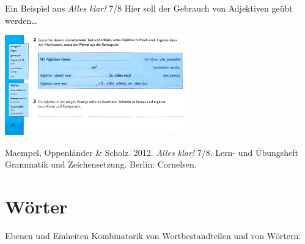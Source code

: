 \begin{frame}
  {Ein Beispiel aus \textit{Alles klar!} 7\slash 8}
  Hier soll der Gebrauch von \alert{Adjektiven} geübt werden\ldots
  \begin{center}
    \includegraphics[width=0.6\textwidth]{graphics/adjektive2}
  \end{center}
  \tiny Maempel, Oppenländer \& Scholz. 2012. \textit{Alles klar!} 7\slash 8. Lern- und Übungsheft Grammatik und Zeichensetzung. Berlin: Cornelsen.
\end{frame}





\section{Wörter}

\begin{frame}
  {Ebenen und Einheiten}
  \pause
  Kombinatorik von Wortbestandteilen und von Wörtern:
  \pause
  \Zeile
  \begin{exe}
    \ex
    \begin{xlist}
      \pause
    \end{xlist}
    \pause
    \Zeile
    \ex
    \begin{xlist}
      \pause
    \end{xlist}
  \end{exe}
\end{frame}

